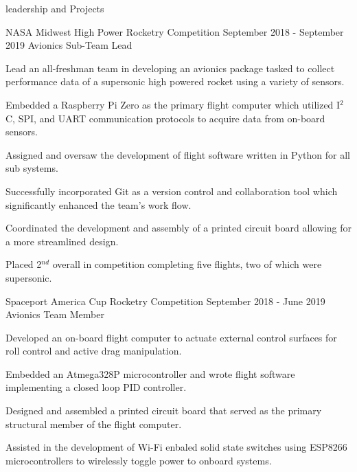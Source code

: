 \documentclass{resume} %
\begin{document}
\begin{rSection} {leadership and Projects}
\begin{rSubsection} {NASA Midwest High Power Rocketry Competition} {September 2018 - September 2019} {Avionics Sub-Team Lead}
            \item Lead an all-freshman team in developing an avionics package tasked to collect performance data of a supersonic high powered rocket using a variety of sensors.
            \item Embedded a Raspberry Pi Zero as the primary flight computer which utilized I$^2$C, SPI, and UART communication protocols to acquire data from on-board sensors.
            \item Assigned and oversaw the development of flight software written in Python for all sub systems.
            \item Successfully incorporated Git as a version control and collaboration tool which significantly enhanced the team's work flow.
            \item Coordinated the development and assembly of a printed circuit board allowing for a more streamlined design.
            \item Placed 2$^{nd}$ overall in competition completing five flights, two of which were supersonic.

        \end{rSubsection}

        \smallskip


        \begin{rSubsection} {Spaceport America Cup Rocketry Competition} {September 2018 - June 2019} {Avionics Team Member}

            \item Developed an on-board flight computer to actuate external control surfaces for roll control and active drag manipulation.
            \item Embedded an Atmega328P microcontroller and wrote flight software implementing a closed loop PID controller.
            \item Designed and assembled a printed circuit board that served as the primary structural member of the flight computer.
            \item Assisted in the development of Wi-Fi enbaled solid state switches using ESP8266 microcontrollers to wirelessly toggle power to onboard systems.

        \end{rSubsection}

    \end{rSection}
\end{document}
